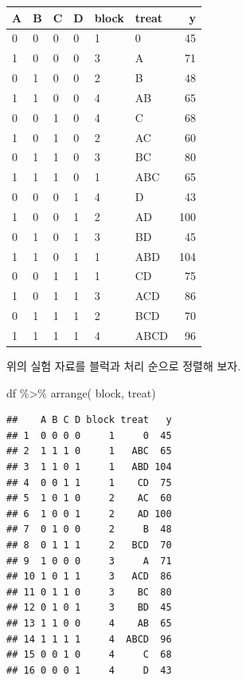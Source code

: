 \documentclass[
]{book}
\newenvironment{Shaded}{\begin{snugshade}}{\end{snugshade}}
\newcommand{\FunctionTok}[1]{\textcolor[rgb]{0.00,0.00,0.00}{#1}}
\newcommand{\NormalTok}[1]{#1}
\newcommand{\SpecialCharTok}[1]{\textcolor[rgb]{0.00,0.00,0.00}{#1}}
\begin{document}
\begin{table}
\centering
\begin{tabular}[t]{l|l|l|l|l|l|r}
\hline
A & B & C & D & block & treat & y\\
\hline
0 & 0 & 0 & 0 & 1 & 0 & 45\\
\hline
1 & 0 & 0 & 0 & 3 & A & 71\\
\hline
0 & 1 & 0 & 0 & 2 & B & 48\\
\hline
1 & 1 & 0 & 0 & 4 & AB & 65\\
\hline
0 & 0 & 1 & 0 & 4 & C & 68\\
\hline
1 & 0 & 1 & 0 & 2 & AC & 60\\
\hline
0 & 1 & 1 & 0 & 3 & BC & 80\\
\hline
1 & 1 & 1 & 0 & 1 & ABC & 65\\
\hline
0 & 0 & 0 & 1 & 4 & D & 43\\
\hline
1 & 0 & 0 & 1 & 2 & AD & 100\\
\hline
0 & 1 & 0 & 1 & 3 & BD & 45\\
\hline
1 & 1 & 0 & 1 & 1 & ABD & 104\\
\hline
0 & 0 & 1 & 1 & 1 & CD & 75\\
\hline
1 & 0 & 1 & 1 & 3 & ACD & 86\\
\hline
0 & 1 & 1 & 1 & 2 & BCD & 70\\
\hline
1 & 1 & 1 & 1 & 4 & ABCD & 96\\
\hline
\end{tabular}
\end{table}

위의 실험 자료를 블럭과 처리 순으로 정렬해 보자.

\begin{Shaded}
\begin{Highlighting}[]
\NormalTok{df }\SpecialCharTok{\%\textgreater{}\%} \FunctionTok{arrange}\NormalTok{( block, treat)}
\end{Highlighting}
\end{Shaded}

\begin{verbatim}
##    A B C D block treat   y
## 1  0 0 0 0     1     0  45
## 2  1 1 1 0     1   ABC  65
## 3  1 1 0 1     1   ABD 104
## 4  0 0 1 1     1    CD  75
## 5  1 0 1 0     2    AC  60
## 6  1 0 0 1     2    AD 100
## 7  0 1 0 0     2     B  48
## 8  0 1 1 1     2   BCD  70
## 9  1 0 0 0     3     A  71
## 10 1 0 1 1     3   ACD  86
## 11 0 1 1 0     3    BC  80
## 12 0 1 0 1     3    BD  45
## 13 1 1 0 0     4    AB  65
## 14 1 1 1 1     4  ABCD  96
## 15 0 0 1 0     4     C  68
## 16 0 0 0 1     4     D  43
\end{verbatim}
\end{document}
